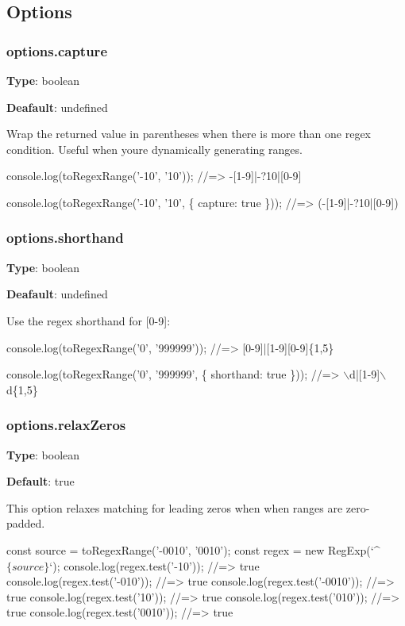 \subsection*{Options}

\subsubsection*{options.\+capture}

{\bfseries Type}\+: {\ttfamily boolean}

{\bfseries Deafault}\+: {\ttfamily undefined}

Wrap the returned value in parentheses when there is more than one regex condition. Useful when you\textquotesingle{}re dynamically generating ranges.


\begin{DoxyCode}
console.log(toRegexRange('-10', '10'));
//=> -[1-9]|-?10|[0-9]

console.log(toRegexRange('-10', '10', \{ capture: true \}));
//=> (-[1-9]|-?10|[0-9])
\end{DoxyCode}


\subsubsection*{options.\+shorthand}

{\bfseries Type}\+: {\ttfamily boolean}

{\bfseries Deafault}\+: {\ttfamily undefined}

Use the regex shorthand for {\ttfamily \mbox{[}0-\/9\mbox{]}}\+:


\begin{DoxyCode}
console.log(toRegexRange('0', '999999'));
//=> [0-9]|[1-9][0-9]\{1,5\}

console.log(toRegexRange('0', '999999', \{ shorthand: true \}));
//=> \(\backslash\)d|[1-9]\(\backslash\)d\{1,5\}
\end{DoxyCode}


\subsubsection*{options.\+relax\+Zeros}

{\bfseries Type}\+: {\ttfamily boolean}

{\bfseries Default}\+: {\ttfamily true}

This option relaxes matching for leading zeros when when ranges are zero-\/padded.


\begin{DoxyCode}
const source = toRegexRange('-0010', '0010');
const regex = new RegExp(`^$\{source\}$`);
console.log(regex.test('-10')); //=> true
console.log(regex.test('-010')); //=> true
console.log(regex.test('-0010')); //=> true
console.log(regex.test('10')); //=> true
console.log(regex.test('010')); //=> true
console.log(regex.test('0010')); //=> true
\end{DoxyCode}


